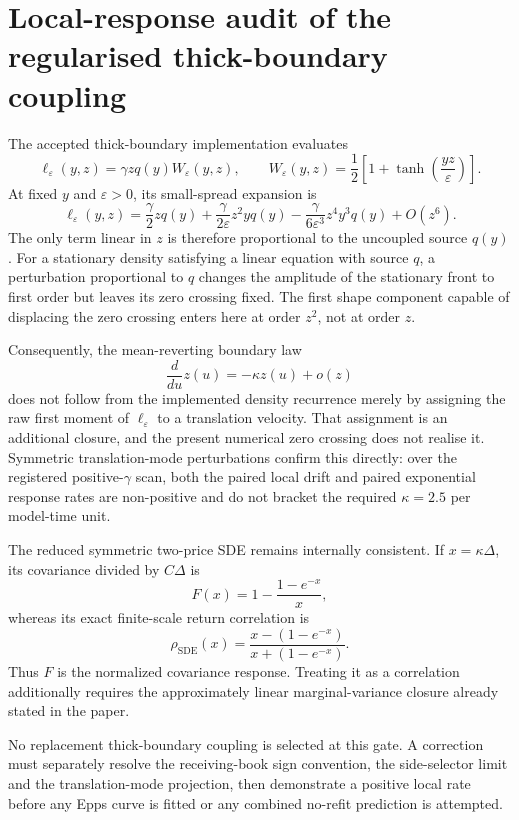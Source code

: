 
\section*{Local-response audit of the regularised thick-boundary coupling}

The accepted thick-boundary implementation evaluates
\[
  \ell_\varepsilon(y,z)
  =\gamma zq(y)W_\varepsilon(y,z),
  \qquad
  W_\varepsilon(y,z)
  =\frac12\left[1+\tanh\left(\frac{yz}{\varepsilon}\right)\right].
\]
At fixed $y$ and $\varepsilon>0$, its small-spread expansion is
\[
  \ell_\varepsilon(y,z)
  =\frac{\gamma}{2}zq(y)
   +\frac{\gamma}{2\varepsilon}z^2yq(y)
   -\frac{\gamma}{6\varepsilon^3}z^4y^3q(y)
   +O(z^6).
\]
The only term linear in $z$ is therefore proportional to the uncoupled source
$q(y)$.  For a stationary density satisfying a linear equation with source
$q$, a perturbation proportional to $q$ changes the amplitude of the
stationary front to first order but leaves its zero crossing fixed.  The
first shape component capable of displacing the zero crossing enters here at
order $z^2$, not at order $z$.

Consequently, the mean-reverting boundary law
\[
  \frac{d}{du}z(u)=-\kappa z(u)+o(z)
\]
does not follow from the implemented density recurrence merely by assigning
the raw first moment of $\ell_\varepsilon$ to a translation velocity.  That
assignment is an additional closure, and the present numerical zero crossing
does not realise it.  Symmetric translation-mode perturbations confirm this
directly: over the registered positive-$\gamma$ scan, both the paired local
drift and paired exponential response rates are non-positive and do not
bracket the required $\kappa=2.5$ per model-time unit.

The reduced symmetric two-price SDE remains internally consistent.  If
$x=\kappa\Delta$, its covariance divided by $C\Delta$ is
\[
  F(x)=1-\frac{1-e^{-x}}{x},
\]
whereas its exact finite-scale return correlation is
\[
  \rho_{\mathrm{SDE}}(x)
  =\frac{x-(1-e^{-x})}{x+(1-e^{-x})}.
\]
Thus $F$ is the normalized covariance response.  Treating it as a correlation
additionally requires the approximately linear marginal-variance closure
already stated in the paper.

No replacement thick-boundary coupling is selected at this gate.  A correction
must separately resolve the receiving-book sign convention, the side-selector
limit and the translation-mode projection, then demonstrate a positive local
rate before any Epps curve is fitted or any combined no-refit prediction is
attempted.
